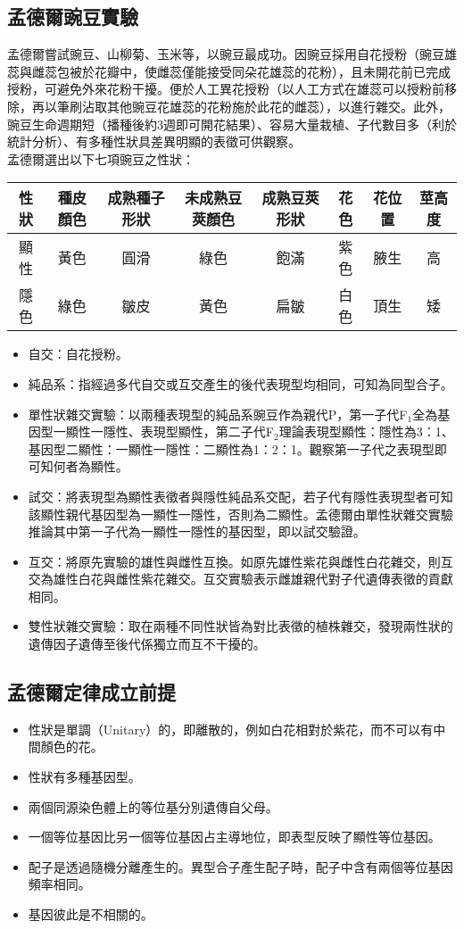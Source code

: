 \documentclass[a4paper,12pt]{report}
\begin{document}
\subsection{孟德爾豌豆實驗}
孟德爾嘗試豌豆、山柳菊、玉米等，以豌豆最成功。因豌豆採用自花授粉（豌豆雄蕊與雌蕊包被於花瓣中，使雌蕊僅能接受同朵花雄蕊的花粉），且未開花前已完成授粉，可避免外來花粉干擾。便於人工異花授粉（以人工方式在雄蕊可以授粉前移除，再以筆刷沾取其他豌豆花雄蕊的花粉施於此花的雌蕊），以進行雜交。此外，豌豆生命週期短（播種後約3週即可開花結果）、容易大量栽植、子代數目多（利於統計分析）、有多種性狀具差異明顯的表徵可供觀察。\\
孟德爾選出以下七項豌豆之性狀：
\begin{center}
\begin{tabular}{|c|c|c|c|c|c|c|c|}
\hline
性狀 & 種皮顏色 & 成熟種子形狀 & 未成熟豆莢顏色 & 成熟豆莢形狀 & 花色 & 花位置 & 莖高度 \\ \hline 
顯性 & 黃色 & 圓滑 & 綠色 & 飽滿 & 紫色 & 腋生 & 高 \\ \hline 
隱色 & 綠色 & 皺皮 & 黃色 & 扁皺 & 白色 & 頂生 & 矮 \\ \hline
\end{tabular}
\end{center}
\begin{itemize}
\item 自交：自花授粉。
\item 純品系：指經過多代自交或互交產生的後代表現型均相同，可知為同型合子。
\item 單性狀雜交實驗：以兩種表現型的純品系豌豆作為親代P，第一子代F$_1$全為基因型一顯性一隱性、表現型顯性，第二子代F$_2$理論表現型顯性：隱性為3：1、基因型二顯性：一顯性一隱性：二顯性為1：2：1。觀察第一子代之表現型即可知何者為顯性。
\item 試交：將表現型為顯性表徵者與隱性純品系交配，若子代有隱性表現型者可知該顯性親代基因型為一顯性一隱性，否則為二顯性。孟德爾由單性狀雜交實驗推論其中第一子代為一顯性一隱性的基因型，即以試交驗證。
\item 互交：將原先實驗的雄性與雌性互換。如原先雄性紫花與雌性白花雜交，則互交為雄性白花與雌性紫花雜交。互交實驗表示雌雄親代對子代遺傳表徵的貢獻相同。
\item 雙性狀雜交實驗：取在兩種不同性狀皆為對比表徵的植株雜交，發現兩性狀的遺傳因子遺傳至後代係獨立而互不干擾的。
\end{itemize}
\subsection{孟德爾定律成立前提}
\begin{itemize}
\item 性狀是單調（Unitary）的，即離散的，例如白花相對於紫花，而不可以有中間顏色的花。
\item 性狀有多種基因型。
\item 兩個同源染色體上的等位基分別遺傳自父母。
\item 一個等位基因比另一個等位基因占主導地位，即表型反映了顯性等位基因。
\item 配子是透過隨機分離產生的。異型合子產生配子時，配子中含有兩個等位基因頻率相同。
\item 基因彼此是不相關的。
\end{itemize}
\end{document}
